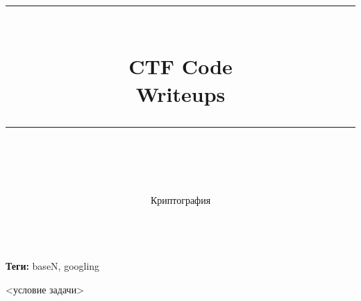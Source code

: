 \documentclass[idxtotoc,hyperref,openany,oneside]{files/crypto} %
\newcommand{\HRule}{\rule{\linewidth}{0.5mm}} %
\begin{document}

\frontmatter %
\title{
\begin{center}
\HRule \\[0.4cm]
{\Huge \bfseries CTF Code \\[0.5cm] \Large Writeups}\\[0.4cm] %
\HRule \\[1.5cm]
\end{center}
}
\author{\Huge Криптография \\ \\[2cm]} %
\maketitle

\tableofcontents

\mainmatter %












\textbf{Теги:} baseN, googling\vspace{\baselineskip}

\begin{tcolorbox}
<условие задачи>
\end{tcolorbox}
\end{document}
